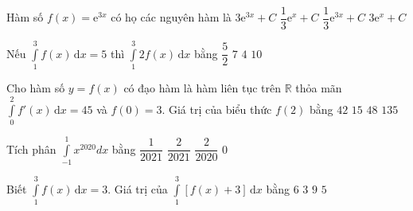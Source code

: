 \begin{ex}%
	Hàm số $f(x)=\mathrm{e}^{3x}$ có họ các nguyên hàm là
	\choice
	{$3\mathrm{e}^{3x}+C$}
	{$\dfrac{1}{3}\mathrm{e}^x+C$}
	{\True $\dfrac{1}{3}\mathrm{e}^{3x}+C$}
	{$3\mathrm{e}^x+C$}
\end{ex}

%

\begin{ex}%
	Nếu $\displaystyle\int\limits_1^3 f(x) \mathrm{\,d}x=5$ thì $\displaystyle\int\limits_1^3 2f(x) \mathrm{\,d}x$ bằng
	\choice
	{$\dfrac{5}{2}$}
	{$7$}
	{$4$}
	{\True $10$}
\end{ex}

\begin{ex}%
	Cho hàm số $y=f(x)$ có đạo hàm là hàm liên tục trên $\mathbb{R}$ thỏa mãn $\displaystyle\int\limits_0^2 f'(x) \mathrm{\,d} x=45$ và $f(0)=3$. Giá trị của biểu thức $f(2)$ bằng
	\choice
	{$42$}
	{$15$}
	{\True $48$}
	{$135$}
\end{ex}

\begin{ex}%
	Tích phân $\displaystyle\int\limits_{-1}^1x^{2020}dx$ bằng
	\choice
	{$\dfrac{1}{2021}$}
	{\True $\dfrac{2}{2021}$}
	{$\dfrac{2}{2020}$}
	{$0$}
\end{ex}

\begin{ex}%
	Biết $\displaystyle\int\limits_1^3f(x)\mathrm{\,d}x=3$. Giá trị của $\displaystyle\int\limits_1^3[f(x)+3]\mathrm{\,d}x$ bằng
	\choice
	{$6$}
	{$3$}
	{\True $9$}
	{$5$}
\end{ex}

